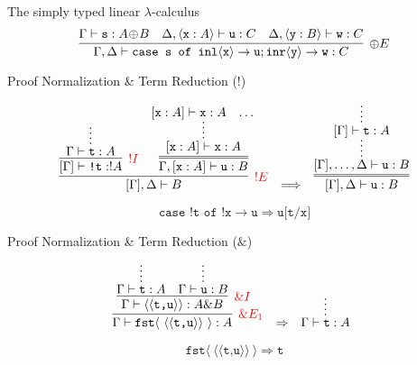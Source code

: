 \documentclass{beamer}
\newcommand{\term}[1]{\texttt{#1}}
\newcommand{\loplus}{\!\oplus\!}
\newcommand{\lin}[1]{\langle#1\rangle}
\newcommand{\lint}[1]{[#1]}
\begin{document}
\begin{frame}{The simply typed linear $\lambda$-calculus}
{{{{{{		\[
			\vcenter{\infer[\oplus E]{\Gamma, \Delta \vdash \term{case s of inl}\lin{\term{x}}\to \term{u}; \term{inr}\lin{\term{y}}\to\term{w}: C}{
				\Gamma \vdash \term{s}: A\loplus B
				&
				\Delta, \lin{\term{x}: A} \vdash \term{u}: C
				&
				\Delta, \lin{\term{y}: B} \vdash \term{w}: C
			}}
		\]
	}}}}}}
\end{frame}

\begin{frame}{Proof Normalization \& Term Reduction ($!$)}
	\small 
	
	\[
		\begin{array}{ccc}
		\infer[\textcolor{red}{! E}]{\lint{\Gamma}, \Delta \vdash B}{
			\infer[\textcolor{red}{!I}]{\lint{\Gamma} \vdash \term{!t}: !A}{
				\infer*[]{\Gamma \vdash \term{t}: A}{}			
			}
			&
			\infer={\Gamma, \lint{\term{x}: A} \vdash \term{u}: B}{
				\infer*[]{\lint{\term{x}: A} \vdash \term{x}: A}{
					\lint{\term{x}: A} \vdash \term{x}: A
					&
					\dots
				}
			}
		}
		&
		\Longrightarrow
		&
		\infer={\lint{\Gamma}, \Delta \vdash \term{u}: B}{
			\infer*{\lint{\Gamma}, \dots, \Delta \vdash \term{u}: B}{
				\infer*{\lint{\Gamma} \vdash \term{t}: A}{}
			}
		}
		\end{array}
	\]	
	
	\alert{
	\[
		\term{case !t of !x}\to\term{u} \Longrightarrow \term{u[t/x]}
	\]
	}
\end{frame}

\begin{frame}{Proof Normalization \& Term Reduction ($\&$)}
	\small 
	
	\[
		\begin{array}[t]{@{}ccc}
			\infer[\textcolor{red}{\&E_1}]{\Gamma \vdash \term{fst}\lin{~\lin{\lin{\term{t,u}}}~}: A}{
				\infer[\textcolor{red}{\&I}]{\Gamma \vdash \lin{\lin{\term{t,u}}}: A\& B}{
				\infer*{\Gamma \vdash \term{t}: A}{}
				&
				\infer*{\Gamma \vdash \term{u}: B}{}
				}
			}		
			&
			\Rightarrow
			&
			\infer*{\Gamma \vdash \term{t}: A}{}
		\end{array}
	\]	
	
	\alert{
	\[
		\term{fst}\lin{~\lin{\lin{\term{t,u}}}~} \Longrightarrow \term{t}
	\]
	}
\end{frame}
\end{document}
